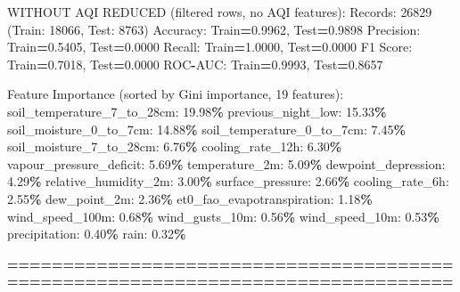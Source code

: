 \documentclass[
  letterpaper,
  DIV=11,
  numbers=noendperiod]{scrartcl}
\newenvironment{Shaded}{\begin{snugshade}}{\end{snugshade}}
\newcommand{\BuiltInTok}[1]{#1}
\newcommand{\DecValTok}[1]{\textcolor[rgb]{0.00,0.00,0.81}{#1}}
\newcommand{\FloatTok}[1]{\textcolor[rgb]{0.00,0.00,0.81}{#1}}
\newcommand{\NormalTok}[1]{#1}
\newcommand{\OperatorTok}[1]{\textcolor[rgb]{0.81,0.36,0.00}{\textbf{#1}}}
\begin{document}
\begin{Shaded}
\begin{Highlighting}[]
\NormalTok{WITHOUT AQI REDUCED (filtered rows, no AQI features):}
\NormalTok{  Records: }\DecValTok{26829}\NormalTok{ (Train: }\DecValTok{18066}\NormalTok{, Test: }\DecValTok{8763}\NormalTok{)}
\NormalTok{  Accuracy: Train}\OperatorTok{=}\FloatTok{0.9962}\NormalTok{, Test}\OperatorTok{=}\FloatTok{0.9898}
\NormalTok{  Precision: Train}\OperatorTok{=}\FloatTok{0.5405}\NormalTok{, Test}\OperatorTok{=}\FloatTok{0.0000}
\NormalTok{  Recall: Train}\OperatorTok{=}\FloatTok{1.0000}\NormalTok{, Test}\OperatorTok{=}\FloatTok{0.0000}
\NormalTok{  F1 Score: Train}\OperatorTok{=}\FloatTok{0.7018}\NormalTok{, Test}\OperatorTok{=}\FloatTok{0.0000}
\NormalTok{  ROC}\OperatorTok{{-}}\NormalTok{AUC: Train}\OperatorTok{=}\FloatTok{0.9993}\NormalTok{, Test}\OperatorTok{=}\FloatTok{0.8657}

\NormalTok{  Feature Importance (}\BuiltInTok{sorted}\NormalTok{ by Gini importance, }\DecValTok{19}\NormalTok{ features):}
\NormalTok{    soil\_temperature\_7\_to\_28cm: }\FloatTok{19.98}\OperatorTok{\%}
\NormalTok{    previous\_night\_low: }\FloatTok{15.33}\OperatorTok{\%}
\NormalTok{    soil\_moisture\_0\_to\_7cm: }\FloatTok{14.88}\OperatorTok{\%}
\NormalTok{    soil\_temperature\_0\_to\_7cm: }\FloatTok{7.45}\OperatorTok{\%}
\NormalTok{    soil\_moisture\_7\_to\_28cm: }\FloatTok{6.76}\OperatorTok{\%}
\NormalTok{    cooling\_rate\_12h: }\FloatTok{6.30}\OperatorTok{\%}
\NormalTok{    vapour\_pressure\_deficit: }\FloatTok{5.69}\OperatorTok{\%}
\NormalTok{    temperature\_2m: }\FloatTok{5.09}\OperatorTok{\%}
\NormalTok{    dewpoint\_depression: }\FloatTok{4.29}\OperatorTok{\%}
\NormalTok{    relative\_humidity\_2m: }\FloatTok{3.00}\OperatorTok{\%}
\NormalTok{    surface\_pressure: }\FloatTok{2.66}\OperatorTok{\%}
\NormalTok{    cooling\_rate\_6h: }\FloatTok{2.55}\OperatorTok{\%}
\NormalTok{    dew\_point\_2m: }\FloatTok{2.36}\OperatorTok{\%}
\NormalTok{    et0\_fao\_evapotranspiration: }\FloatTok{1.18}\OperatorTok{\%}
\NormalTok{    wind\_speed\_100m: }\FloatTok{0.68}\OperatorTok{\%}
\NormalTok{    wind\_gusts\_10m: }\FloatTok{0.56}\OperatorTok{\%}
\NormalTok{    wind\_speed\_10m: }\FloatTok{0.53}\OperatorTok{\%}
\NormalTok{    precipitation: }\FloatTok{0.40}\OperatorTok{\%}
\NormalTok{    rain: }\FloatTok{0.32}\OperatorTok{\%}

\OperatorTok{================================================================================}


\end{Highlighting}
\end{Shaded}
\end{document}
